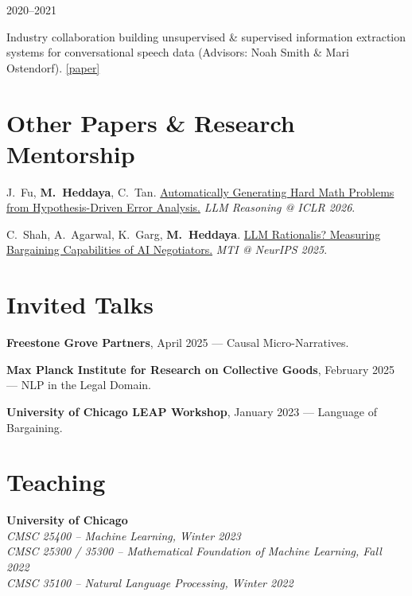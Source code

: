 \documentclass[11pt,letterpaper]{article}
\begin{document}
\vspace{4pt}
 \hfill 2020--2021
\begin{cvitems}
    \item Industry collaboration building unsupervised \& supervised information extraction systems for conversational speech data (Advisors: Noah Smith \& Mari Ostendorf). \href{https://arxiv.org/abs/2205.12967}{[paper]}
\end{cvitems}

\section*{Other Papers \& Research Mentorship}

\begin{cvitems}
    \item J.\ Fu, \textbf{M.\ Heddaya}, C.\ Tan. \href{https://openreview.net/forum?id=d1PcXKaAON}{Automatically Generating Hard Math Problems from Hypothesis-Driven Error Analysis.} \textit{LLM Reasoning @ ICLR 2026}.
    \item C.\ Shah, A.\ Agarwal, K.\ Garg, \textbf{M.\ Heddaya}. \href{https://neurips.cc/virtual/2025/loc/san-diego/128019}{LLM Rationalis? Measuring Bargaining Capabilities of AI Negotiators.} \textit{MTI @ NeurIPS 2025}.
\end{cvitems}

\section*{Invited Talks}

\textbf{Freestone Grove Partners}, April 2025 --- Causal Micro-Narratives.

\vspace{4pt}

\textbf{Max Planck Institute for Research on Collective Goods}, February 2025 --- NLP in the Legal Domain.

\vspace{4pt}

\textbf{University of Chicago LEAP Workshop}, January 2023 --- Language of Bargaining.

\section*{Teaching}

\textbf{University of Chicago}\\
\hspace*{2em}\textit{CMSC 25400 -- Machine Learning, Winter 2023}\\
\hspace*{2em}\textit{CMSC 25300 / 35300 -- Mathematical Foundation of Machine Learning, Fall 2022}\\
\hspace*{2em}\textit{CMSC 35100 -- Natural Language Processing, Winter 2022}
\end{document}
